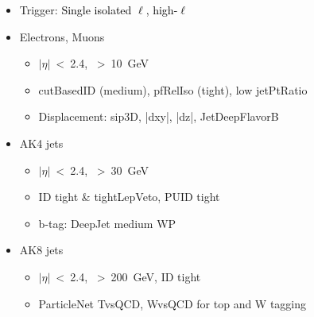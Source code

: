 {  \begin{itemize}
    \small
  \item Trigger: \textcolor{black}{Single isolated $\ell$, high-\pT $\ell$}
    \vspace{0.05cm}
  \item Electrons, Muons
    \begin{itemize}
      \small
    \item $|\eta|$~<~2.4, \pT~>~10~GeV
    \item cutBasedID (medium), pfRelIso (tight), low jetPtRatio
    \item Displacement: sip3D, |dxy|, |dz|, JetDeepFlavorB
    \end{itemize}
    \vspace{0.05cm}
  \item AK4 jets
    \begin{itemize}
      \small
    \item $|\eta|$~<~2.4, \pT~>~30~GeV
    \item ID tight \& tightLepVeto, PUID tight
    \item b-tag: DeepJet medium WP
    \end{itemize}
    \vspace{0.05cm}
  \item AK8 jets
    \begin{itemize}
      \small
    \item $|\eta|$~<~2.4, \pT~>~200~GeV, ID tight
    \item ParticleNet TvsQCD, WvsQCD for top and W tagging
    \end{itemize}
  \end{itemize}

}

